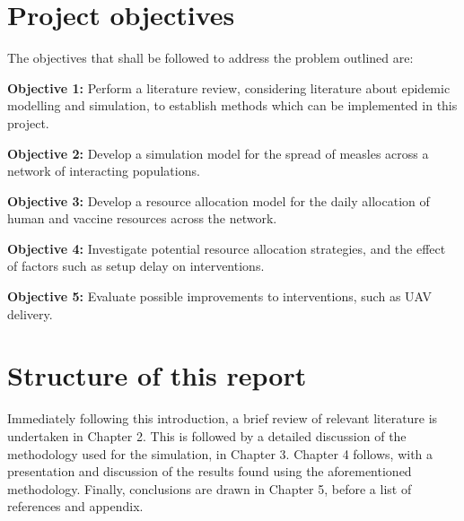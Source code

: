 \section{Project objectives}
The objectives that shall be followed to address the problem outlined are:

\textbf{Objective 1:} Perform a literature review, considering literature about epidemic modelling and simulation, to establish methods which can be implemented in this project. 

\textbf{Objective 2:} Develop a simulation model for the spread of measles across a network of interacting populations.

\textbf{Objective 3:} Develop a resource allocation model for the daily allocation of human and vaccine resources across the network.

\textbf{Objective 4:} Investigate potential resource allocation strategies, and the effect of factors such as setup delay on interventions.

\textbf{Objective 5:} Evaluate possible improvements to interventions, such as UAV delivery.

\section{Structure of this report}
Immediately following this introduction, a brief review of relevant literature is undertaken in Chapter 2. This is followed by a detailed discussion of the methodology used for the simulation, in Chapter 3. Chapter 4 follows, with a presentation and discussion of the results found using the aforementioned methodology. Finally, conclusions are drawn in Chapter 5, before a list of references and appendix.